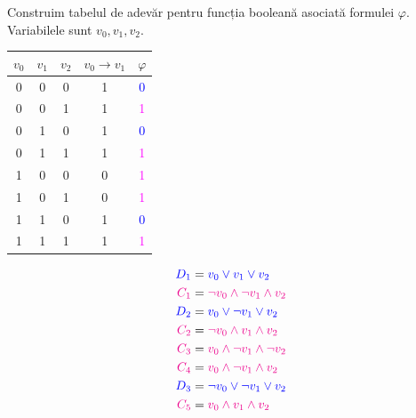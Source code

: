 \begin{solutie}
Construim tabelul de adevăr pentru funcția booleană asociată formulei $\varphi$. Variabilele sunt $v_0, v_1, v_2$.

\vspace{0.3cm}

\begin{minipage}[c]{0.35\textwidth}
	\renewcommand{\arraystretch}{1.2}
	\begin{tabular}{c|c|c|c|c}
		$v_0$ & $v_1$ & $v_2$ & $v_0 \to v_1$ & $\varphi$ \\
		\hline
		0 & 0 & 0 & 1 & \textcolor{blue}{0} \\
		0 & 0 & 1 & 1 & \textcolor{magenta}{1} \\
		0 & 1 & 0 & 1 & \textcolor{blue}{0} \\
		0 & 1 & 1 & 1 & \textcolor{magenta}{1} \\
		1 & 0 & 0 & 0 & \textcolor{magenta}{1} \\
		1 & 0 & 1 & 0 & \textcolor{magenta}{1} \\
		1 & 1 & 0 & 1 & \textcolor{blue}{0} \\
		1 & 1 & 1 & 1 & \textcolor{magenta}{1} \\
	\end{tabular}
\end{minipage}
\begin{minipage}[c]{0.6\textwidth}
	\begin{align*}
		\textcolor{blue}{D_1}    & = \textcolor{blue}{v_0 \lor v_1 \lor v_2} \\
		\textcolor{magenta}{C_1} & = \textcolor{magenta}{\neg v_0 \land \neg v_1 \land v_2} \\
		\textcolor{blue}{D_2}    & = \textcolor{blue}{v_0 \lor \neg v_1 \lor v_2} \\
		\textcolor{magenta}{C_2} & = \textcolor{magenta}{\neg v_0 \land v_1 \land v_2} \\
		\textcolor{magenta}{C_3} & = \textcolor{magenta}{v_0 \land \neg v_1 \land \neg v_2} \\
		\textcolor{magenta}{C_4} & = \textcolor{magenta}{v_0 \land \neg v_1 \land v_2} \\
		\textcolor{blue}{D_3}    & = \textcolor{blue}{\neg v_0 \lor \neg v_1 \lor v_2} \\
		\textcolor{magenta}{C_5} & = \textcolor{magenta}{v_0 \land v_1 \land v_2}
	\end{align*}
\end{minipage}

\vspace{0.5cm}


\end{solutie}
